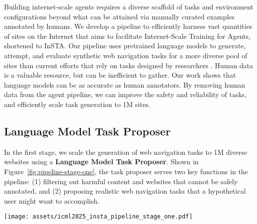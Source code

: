 Building internet-scale agents requires a diverse scaffold of tasks and environment configurations beyond what can be attained via manually curated examples annotated by humans. We develop a pipeline to efficiently harness vast quantities of sites on the Internet that aims to facilitate Internet-Scale Training for Agents, shortened to InSTA. Our pipeline uses pretrained language models to generate, attempt, and evaluate synthetic web navigation tasks for a more diverse pool of sites than current efforts that rely on tasks designed by researchers \citep{Mind2Web,WebArena,AgentQ,VisualWebArena,VisualWebBench,WebLINX,AndroidInTheWild,WebVoyager}. Human data is a valuable resource, but can be inefficient to gather. Our work shows that language models can be as accurate as human annotators. By removing human data from the agent pipeline, we can improve the safety and reliability of tasks, and efficiently scale task generation to 1M sites.

\subsection{Language Model Task Proposer}
\label{sec:proposer}

In the first stage, we scale the generation of web navigation tasks to 1M diverse websites using a \textbf{Language Model Task Proposer}. Shown in Figure~\ref{fig:pipeline-stage-one}, the task proposer serves two key functions in the pipeline: (1) filtering out harmful content and websites that cannot be safely annotated, and (2) proposing realistic web navigation tasks that a hypothetical user might want to accomplish.

\begin{figure*}
    \centering
    \texttt{[image: assets/icml2025\_insta\_pipeline\_stage\_one.pdf]}
    \vspace{-0.3cm}
    \caption{\small \textbf{Task proposal and filtering for 150k live websites.} Starting from 1,000,000 websites, we employ a pretrained language model that marks sites as safe/unsafe for annotation, and assigns a realistic task that a hypothetical user might want to accomplish on each site. The task proposer aggressively filters out 85\% of websites from the pipeline, resulting in 150k safe websites annotated with realistic tasks.}
    \vspace{-0.2cm}
    \label{fig:pipeline-stage-one}
\end{figure*}


